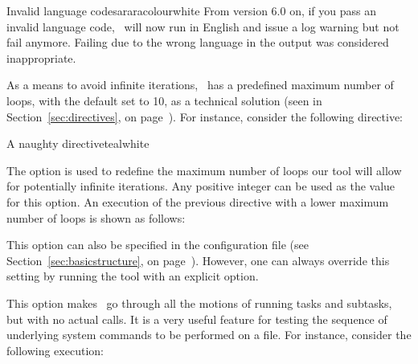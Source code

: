 \begin{description}
\begin{messagebox}{Invalid language codes}{araracolour}{\icinfo}{white}
From version 6.0 on, if you pass an invalid language code, \arara\ will now run in English and issue a log warning but not fail anymore. Failing due to the wrong language in the output was considered inappropriate.
\end{messagebox}

\item[\describeopp{m}{max-loops}{number}] As a means to avoid infinite iterations, \arara\ has a predefined maximum number of loops, with the default set to 10, as a technical solution (seen in Section~\ref{sec:directives}, on page~\pageref{sec:directives}). For instance, consider the following directive:

\begin{codebox}{A naughty directive}{teal}{\icnote}{white}
\end{codebox}

The  option is used to redefine the maximum number of loops our tool will allow for potentially infinite iterations. Any positive integer can be used as the  value for this option. An execution of the previous directive with a lower maximum number of loops is shown as follows:


This option can also be specified in the configuration file (see Section~\ref{sec:basicstructure}, on page~\pageref{sec:basicstructure}). However, one can always override this setting by running the tool with an explicit  option.

\item[\describeop{n}{dry-run}] This option makes \arara\ go through all the motions of running tasks and subtasks, but with no actual calls. It is a very useful feature for testing the sequence of underlying system commands to be performed on a file. For instance, consider the following execution:


\end{description}
